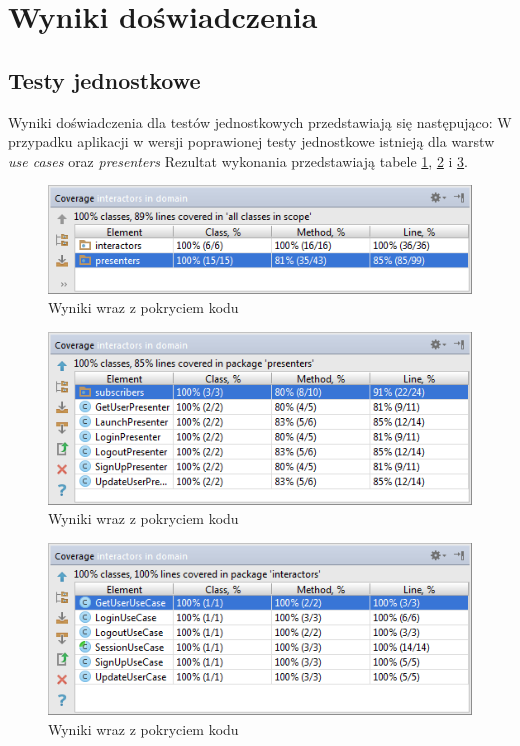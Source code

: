 \section{Wyniki doświadczenia}
\label{wyniki_doswiadczenia}
\subsection{Testy jednostkowe}
Wyniki doświadczenia dla testów jednostkowych przedstawiają się następująco:
W przypadku aplikacji w wersji poprawionej testy jednostkowe istnieją dla warstw \textit{use cases} oraz \textit{presenters} Rezultat wykonania przedstawiają tabele \ref{fig:app_cl_test5}, \ref{fig:app_cl_test3} i \ref{fig:app_cl_test4}.

\begin{figure}[!htb]
    \centering
    \includegraphics[width=12cm]{imgs/ch6_app_cl_test5.png}
    \caption
{Wyniki wraz z pokryciem kodu}
    \label{fig:app_cl_test5}
\end{figure} 

\begin{figure}[!htb]
    \centering
    \includegraphics[width=12cm]{imgs/ch6_app_cl_test3.png}
    \caption
{Wyniki wraz z pokryciem kodu}
    \label{fig:app_cl_test3}
\end{figure} 

\begin{figure}[!htb]
    \centering
    \includegraphics[width=12cm]{imgs/ch6_app_cl_test4.png}
    \caption
{Wyniki wraz z pokryciem kodu}
    \label{fig:app_cl_test4}
\end{figure} 

